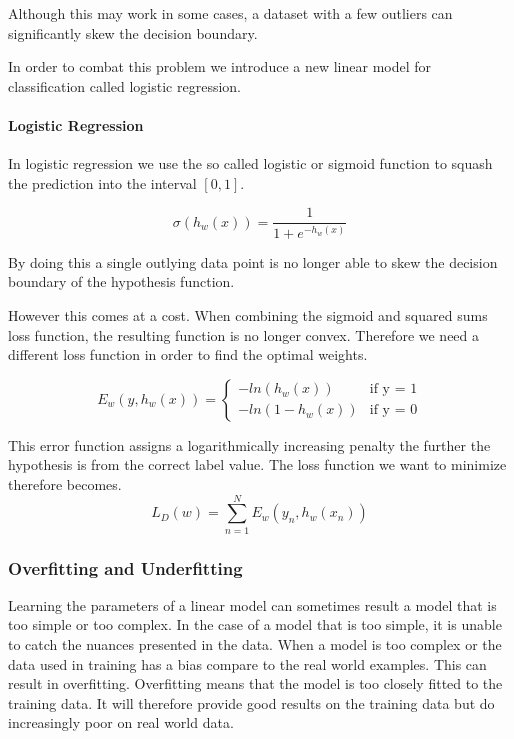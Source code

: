 Although this may work in some cases, a dataset with a few outliers can significantly skew the decision boundary.

In order to combat this problem we introduce a new linear model for classification called logistic regression.

\paragraph{Logistic Regression}\label{sec:logistic}

In logistic regression we use the so called logistic or sigmoid function to squash the prediction into the interval $[0,1]$.

\[ \sigma(h_w(x)) = \frac{1}{1+e^{-h_w(x)}} \]

By doing this a single outlying data point is no longer able to skew the decision boundary of the hypothesis function.

However this comes at a cost.
When combining the sigmoid and squared sums loss function, the resulting function is no longer convex.
Therefore we need a different loss function in order to find the optimal weights.

$$E_w(y,h_w(x)) = \begin{cases}
	-ln(h_w(x)) &\text{if y = 1}\\	
	-ln(1-h_w(x)) &\text{if y = 0}
\end{cases}$$

This error function assigns a logarithmically increasing penalty the further the hypothesis is from the correct label value.
The loss function we want to minimize therefore becomes. 
$$L_D(w) = \sum_{n=1}^N E_w(y_n, h_w(x_n))$$ 

\subsubsection{Overfitting and Underfitting}
Learning the parameters of a linear model can sometimes result a model that is too simple or too complex.
In the case of a model that is too simple, it is unable to catch the nuances presented in the data.
When a model is too complex or the data used in training has a bias compare to the real world examples.
This can result in overfitting.
Overfitting means that the model is too closely fitted to the training data.
It will therefore provide good results on the training data but do increasingly poor on real world data.

